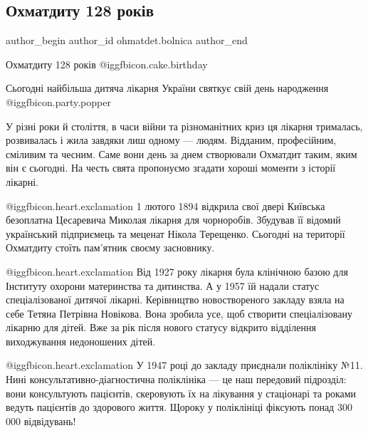  
 
 
 
 
 
\subsection{Охматдиту 128 років}
\label{sec:01_02_2022.fb.ohmatdet.bolnica.1.128_let}
 
\ifcmt
 author_begin
   author_id ohmatdet.bolnica
 author_end
\fi

Охматдиту 128 років @igg{fbicon.cake.birthday} 

Сьогодні найбільша дитяча лікарня України святкує свій день народження  @igg{fbicon.party.popper} 


У різні роки й століття, в часи війни та різноманітних криз ця лікарня
трималась, розвивалась і жила завдяки лиш одному — людям. Відданим,
професійним, сміливим та чесним. Саме вони день за днем створювали Охматдит
таким, яким він є сьогодні. На честь свята пропонуємо згадати хороші моменти з
історії лікарні.

@igg{fbicon.heart.exclamation} 1 лютого 1894 відкрила свої двері Київська
безоплатна Цесаревича Миколая лікарня для чорноробів. Збудував її відомий
український підприємець та меценат Нікола Терещенко. Сьогодні на території
Охматдиту стоїть пам’ятник своєму засновнику.


@igg{fbicon.heart.exclamation} Від 1927 року лікарня була клінічною базою для
Інституту охорони материнства та дитинства. А у 1957 їй надали статус
спеціалізованої дитячої лікарні.  Керівництво новоствореного закладу взяла на
себе Тетяна Петрівна Новікова. Вона зробила усе, щоб створити спеціалізовану
лікарню для дітей. Вже за рік після нового статусу відкрито відділення
виходжування недоношених дітей.

@igg{fbicon.heart.exclamation} У 1947 році до закладу приєднали поліклініку №11. Нині
консультативно-діагностична поліклініка — це наш передовий підрозділ: вони
консультують пацієнтів, скеровують їх на лікування у стаціонарі та роками
ведуть пацієнтів до здорового життя. Щороку у поліклініці фіксують понад 300
000 відвідувань!

